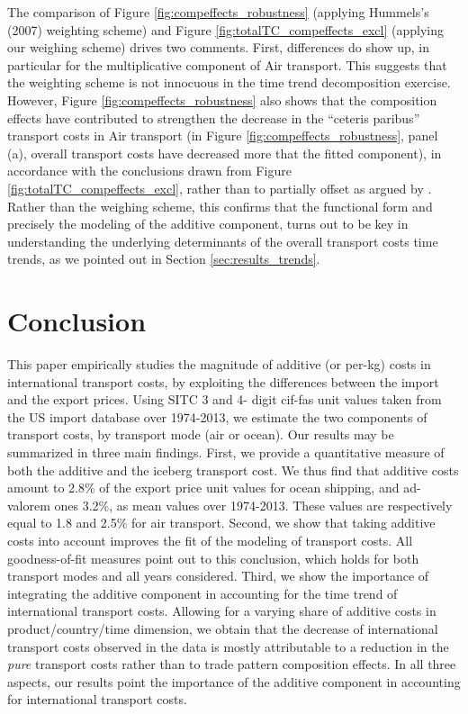 \documentclass[a4paper,11pt]{article}
\begin{document}
The comparison of Figure \ref{fig:compeffects_robustness} (applying Hummels's (2007) weighting scheme) and Figure \ref{fig:totalTC_compeffects_excl} (applying our weighing scheme) drives two comments. First, differences do show up, in particular for the multiplicative component of Air transport. This suggests that the weighting scheme is not innocuous in the time trend decomposition exercise. However, Figure \ref{fig:compeffects_robustness} also shows that the composition effects have contributed to strengthen the decrease in the ``ceteris paribus'' transport costs in Air transport (in Figure \ref{fig:compeffects_robustness}, panel (a), overall transport costs have decreased more that the fitted component), in accordance with the conclusions drawn from Figure \ref{fig:totalTC_compeffects_excl}, rather than to partially offset as argued by \cite{hummels2007}. Rather than the weighing scheme, this confirms that the functional form and precisely the modeling of the additive component, turns out to be key in understanding the underlying determinants of the overall transport costs time trends, as we pointed out in Section \ref{sec:results_trends}.

\section{Conclusion \label{sec:conclu}}

This paper empirically studies the magnitude of additive (or per-kg) costs in international transport costs, by exploiting the differences between the import and the export prices. Using SITC 3 and 4- digit cif-fas unit values taken from the US import database over 1974-2013, we estimate the two components of transport costs, by transport mode (air or ocean).  Our results may be summarized in three main findings. First, we provide a quantitative measure of both the additive and the iceberg transport cost. We thus find that additive costs amount to 2.8\% of the export price unit values for ocean shipping, and ad-valorem ones 3.2\%, as mean values over 1974-2013. These values are respectively equal to 1.8 and 2.5\% for air transport. Second, we show that taking additive costs into account improves the fit of the modeling of transport costs. All goodness-of-fit measures point out to this conclusion, which holds for both transport modes and all years considered. Third, we show the importance of integrating the additive component in accounting for the time trend of international transport costs. Allowing for a varying share of additive costs in product/country/time dimension, we obtain that the decrease of international transport costs observed in the data is mostly attributable to a reduction in the \textit{pure} transport costs rather than to trade pattern composition effects. In all three aspects, our results point the importance of the additive component in accounting for international transport costs.
\end{document}
